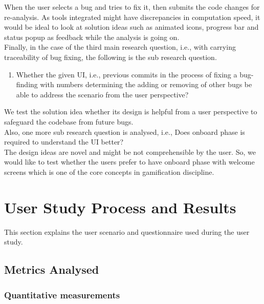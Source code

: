 When the user selects a bug and tries to fix it, then submits the code changes for re-analysis. As tools integrated might have discrepancies in computation speed, it would be ideal to look at solution ideas such as animated icons, progress bar and status popup as feedback while the analysis is going on. \\

Finally, in the case of the third main research question, i.e., with carrying traceability of bug fixing, the following is the sub research question. \\

\begin{enumerate}
	\item Whether the given UI, i.e., previous commits in the process of fixing a bug-finding with numbers determining the adding or removing of other bugs be able to address the scenario from the user perspective? \\
\end{enumerate} 

We test the solution idea whether its design is helpful from a user perspective to safeguard the codebase from future bugs. \\

Also, one more sub research question is analysed, i.e., Does onboard phase is required to understand the UI better? \\

The design ideas are novel and might be not comprehensible by the user. So, we would like to test whether the users prefer to have onboard phase with welcome screens which is one of the core concepts in gamification discipline. \\

\section{User Study Process and Results}

This section explains the user scenario and questionnaire used during the user study.

\subsection{Metrics Analysed}

\subsubsection{Quantitative measurements}  

